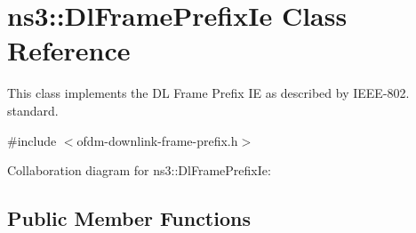 \hypertarget{classns3_1_1DlFramePrefixIe}{}\section{ns3\+:\+:Dl\+Frame\+Prefix\+Ie Class Reference}
\label{classns3_1_1DlFramePrefixIe}


This class implements the DL Frame Prefix IE as described by I\+E\+E\+E-\/802. standard.  




{\ttfamily \#include $<$ofdm-\/downlink-\/frame-\/prefix.\+h$>$}



Collaboration diagram for ns3\+:\+:Dl\+Frame\+Prefix\+Ie\+:
\subsection*{Public Member Functions}
